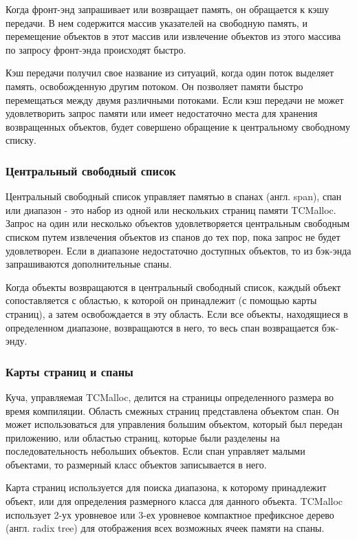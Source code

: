 Когда фронт-энд запрашивает или возвращает память, он обращается к кэшу передачи. В нем содержится массив указателей на свободную память, и перемещение объектов в этот массив или извлечение объектов из этого массива по запросу фронт-энда происходят быстро.

Кэш передачи получил свое название из ситуаций, когда один поток выделяет память, освобожденную другим потоком. Он позволяет памяти быстро перемещаться между двумя различными потоками. Если кэш передачи не может удовлетворить запрос памяти или имеет недостаточно места для хранения возвращенных объектов, будет совершено обращение к центральному свободному списку.

\subsubsection{Центральный свободный список}

Центральный свободный список управляет памятью в спанах (англ. span), спан или диапазон - это набор из одной или нескольких страниц памяти TCMalloc. Запрос на один или несколько объектов удовлетворяется центральным свободным списком путем извлечения объектов из спанов до тех пор, пока запрос не будет удовлетворен. Если в диапазоне недостаточно доступных объектов, то из бэк-энда запрашиваются дополнительные спаны.

Когда объекты возвращаются в центральный свободный список, каждый объект сопоставляется с областью, к которой он принадлежит (с помощью карты страниц), а затем освобождается в эту область. Если все объекты, находящиеся в определенном диапазоне, возвращаются в него, то весь спан возвращается бэк-энду.

\subsubsection{Карты страниц и спаны}

Куча, управляемая TCMalloc, делится на страницы определенного размера во время компиляции. Область смежных страниц представлена объектом спан. Он может использоваться для управления большим объектом, который был передан приложению, или областью страниц, которые были разделены на последовательность небольших объектов. Если спан управляет малыми объектами, то размерный класс объектов записывается в него.

Карта страниц используется для поиска диапазона, к которому принадлежит объект, или для определения размерного класса для данного объекта. TCMalloc использует 2-ух уровневое или 3-ех уровневое компактное префиксное дерево (англ. radix tree) для отображения всех возможных ячеек памяти на спаны.

